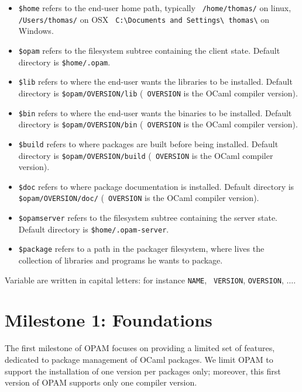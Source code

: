 \documentclass[a4paper,11pt]{article}
\begin{document}
\begin{itemize}

\item {\tt \$home} refers to the end-user home path, typically {\tt
  /home/thomas/} on linux, {\tt /Users/thomas/} on OSX {\tt
  C:\textbackslash Documents and Settings\textbackslash
  thomas\textbackslash} on Windows.

\item {\tt \$opam} refers to the filesystem subtree containing the
  client state. Default directory is {\tt \$home/.opam}.

\item {\tt \$lib} refers to where the end-user wants the libraries to
  be installed. Default directory is {\tt \$opam/OVERSION/lib} ({\tt
    OVERSION} is the OCaml compiler version).

\item {\tt \$bin} refers to where the end-user wants the binaries to
  be installed. Default directory is {\tt \$opam/OVERSION/bin} ({\tt
    OVERSION} is the OCaml compiler version).

\item {\tt \$build} refers to where packages are built before being
  installed. Default directory is {\tt \$opam/OVERSION/build} ({\tt
    OVERSION} is the OCaml compiler version).

\item {\tt \$doc} refers to where package documentation is
  installed. Default directory is {\tt \$opam/OVERSION/doc/} ({\tt
    OVERSION} is the OCaml compiler version).

\item {\tt \$opamserver} refers to the filesystem subtree containing
  the server state. Default directory is {\tt \$home/.opam-server}.

\item {\tt \$package} refers to a path in the packager filesystem, where
  lives the collection of libraries and programs he wants to package.

\end{itemize}

Variable are written in capital letters: for instance {\tt NAME}, {\tt
  VERSION}, {\tt OVERSION}, $\ldots$.

\section{Milestone 1: Foundations}

The first milestone of OPAM focuses on providing a limited set of
features, dedicated to package management of OCaml packages.  We limit
OPAM to support the installation of one version per packages only;
moreover, this first version of OPAM supports only one compiler
version.
\end{document}
